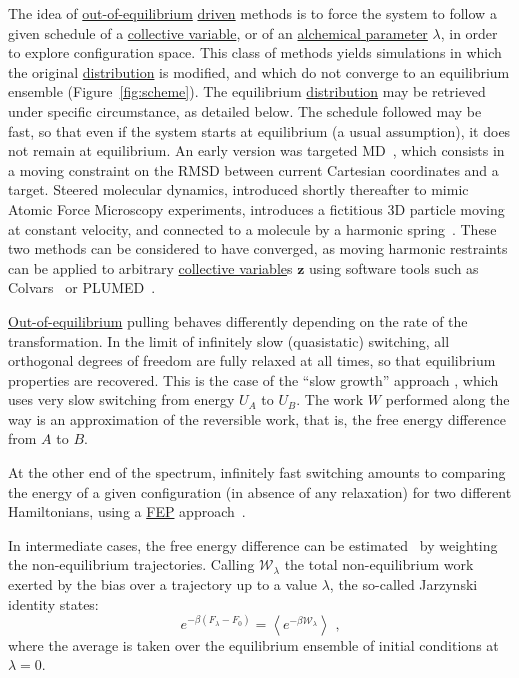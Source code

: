 \documentclass[9pt,review]{livecoms}
\newcommand{\vz}{\mathbf{z}}
\begin{document}
The idea of \hyperlink{ref:OutOfEq} {out-of-equilibrium} \hyperlink{ref:Driven} {driven} methods is to force the system to follow a given schedule of a \hyperlink{ref:CV} {collective variable}, or of an \hyperlink{ref:AuxVar} {\hyperlink{ref:Alchemical} {alchemical} parameter} $\lambda$, in order to explore configuration space. This class of methods yields simulations in which the original \hyperlink{ref:Distribution} {distribution}  is modified, and which do not converge to an equilibrium ensemble (Figure~\ref{fig:scheme}). The equilibrium \hyperlink{ref:Distribution} {distribution}  may be retrieved under specific circumstance, as detailed below. The schedule followed may be fast, so that even if the system starts at equilibrium (a usual assumption), it does not remain at equilibrium.
An early version was targeted MD~\cite{Schlitter1994}, which consists in a moving constraint on the RMSD between current Cartesian coordinates and a target.
Steered molecular dynamics, introduced shortly thereafter to mimic Atomic Force Microscopy experiments, introduces a fictitious 3D particle moving at constant velocity, and connected to a molecule by a harmonic spring~\cite{Grubmueller1996}.
These two methods can be considered to have converged, as moving harmonic restraints can be applied to arbitrary \hyperlink{ref:CV} {collective variable}s $\vz$ using software tools such as Colvars~\cite{Fiorin2013} or PLUMED~\cite{Tribello2014}.

\hyperlink{ref:OutOfEq} {Out-of-equilibrium} pulling behaves differently depending on the rate of the transformation.
In the limit of infinitely slow (quasistatic) switching, all orthogonal degrees of freedom are fully relaxed at all times, so that equilibrium properties are recovered.
This is the case of the ``slow growth'' approach \cite{Postma1982}, which uses very slow switching from energy $U_A$ to $U_B$. The work $W$ performed along the way is an approximation of the reversible work, that is, the free energy difference from $A$ to $B$.

At the other end of the spectrum, infinitely fast switching amounts to comparing the energy of a given configuration (in absence of any relaxation) for two different Hamiltonians, using a \hyperlink{ref:FEP} {FEP} approach~\cite{Kirkwood1935,Zwanzig1954}.


In intermediate cases, the free energy difference can be estimated~\cite{jarzynski-97} by weighting the non-equilibrium trajectories.
Calling $\mathcal W_\lambda$ the total non-equilibrium work exerted by the bias over a trajectory up to a value $\lambda$, the so-called Jarzynski identity states:
\begin{equation}
\label{eq:jarz}
e^{-\beta (F_\lambda - F_0)} = \left\langle e^{-\beta \mathcal W_\lambda}\right\rangle \text{ ,}
\end{equation}
where the average is taken over the equilibrium ensemble of initial conditions at $\lambda = 0$.
\end{document}
